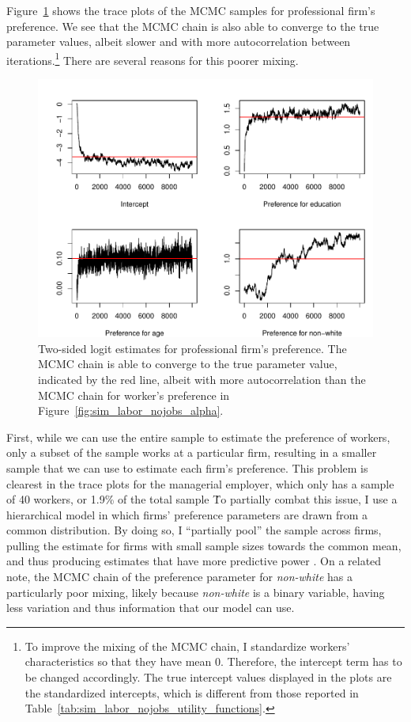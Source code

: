 Figure~\ref{fig:sim_labor_nojobs_beta_emp2} shows the trace plots of the MCMC
samples for professional firm's preference. We see that the MCMC chain is also
able to converge to the true parameter values, albeit slower and with more
autocorrelation between iterations.\footnote{To improve the mixing of the MCMC
  chain, I standardize workers' characteristics so that they have mean 0.
  Therefore, the intercept term has to be changed accordingly. The true
  intercept values displayed in the plots are the standardized intercepts, which
  is different from those reported in Table~\ref{tab:sim_labor_nojobs_utility_functions}.} There are several reasons for this poorer
mixing.

\begin{figure}[!ht]
  \centering
  \includegraphics[width=\textwidth,keepaspectratio]{../figure/sim_labor_nojobs_beta_emp2}
  \caption[Simulation, estimates for professional firm's preference.]{Two-sided logit estimates for professional firm's preference. The
    MCMC chain is able to converge to the true parameter value, indicated by the
  red line, albeit with more autocorrelation than the MCMC chain for worker's
  preference in Figure~\ref{fig:sim_labor_nojobs_alpha}.}
  \label{fig:sim_labor_nojobs_beta_emp2}
\end{figure}

First, while we can use the entire sample to estimate the preference of
workers, only a subset of the sample works at a particular firm, resulting in a
smaller sample that we can use to estimate each firm's preference. This problem
is clearest in the trace plots for the managerial employer, which only has a
sample of 40 workers, or 1.9\% of the total sample \. To partially
combat this issue, I use a hierarchical model in which firms' preference
parameters are drawn from a common distribution. By doing so, I ``partially
pool'' the sample across firms, pulling the estimate for firms with small sample
sizes towards the common mean, and thus producing estimates that have more
predictive power \citep{Gelman2006}. On a related note, the MCMC chain of the
preference parameter for \textit{non-white} has a particularly poor mixing,
likely because \textit{non-white} is a binary variable, having less variation
and thus information that our model can use.

